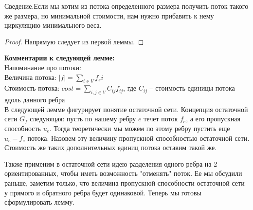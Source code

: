 \begin{lemma}
	Сведение.Если мы хотим из потока определенного размера получить поток такого же размера, но минимальной стоимости, нам нужно прибавить к нему циркуляцию минимального веса.
\end{lemma}
\begin{proof}
	Напрямую следует из первой леммы.
\end{proof}

{\bfseries Комментарии к следующей лемме:}\\

Напоминание про потоки:\\
Величина потока: $|f| = \sum_{i\in V} f_si$  \\
Стоимость потока: $cost = \sum_{i,j\in V} C_{ij}f_{ij} $, где $C_{ij}$ -- стоимость единицы потока вдоль данного ребра\\
	
В следующей лемме фигурирует понятие остаточной сети. Концепция остаточной сети $G_f$ следующая: пусть по нашему ребру $e$ течет поток $f_e$, а его пропускная способность $u_e$. Тогда теоретически мы можем по этому ребру пустить еще $u_e - f_e$ потока. Назовем эту величину 
пропускной способностью остаточной сети. Стоимость же таких дополнительных единиц потока оставим такой же.

Также применим в остаточной сети идею разделения одного ребра на 2 ориентированных, чтобы иметь возможность "отменять" поток. Ее мы обсудили раньше, заметим только, что величина пропускной способности остаточной 
сети у прямого и обратного ребра будет одинаковой. Теперь мы готовы сформулировать лемму.


